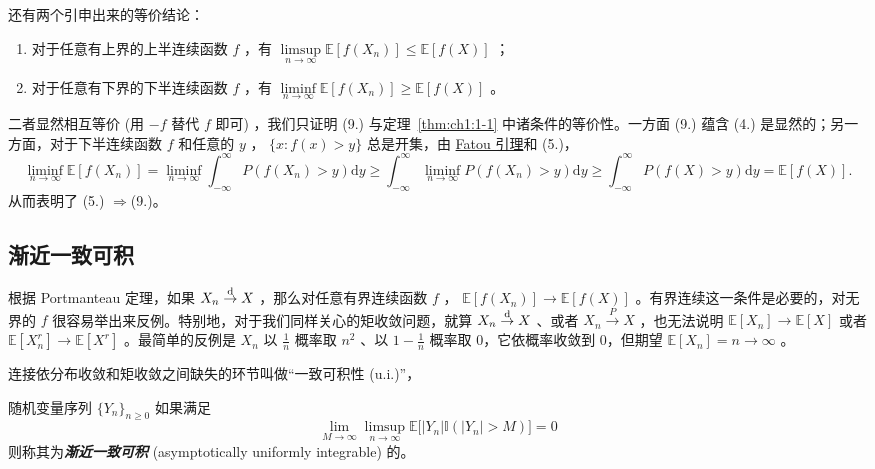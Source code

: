 \begin{remark}


  还有两个引申出来的等价结论：
  \begin{enumerate}
\tightlist
\item[8.] 对于任意有上界的上半连续函数 $f$ ，有 $\limsup\limits_{n\to\infty}\mathbb{E}[f(X_n)]\le\mathbb{E}[f(X)]$ ；
    \item[9.] 对于任意有下界的下半连续函数 $f$ ，有 $\liminf\limits_{n\to\infty}\mathbb{E}[f(X_n)]\ge\mathbb{E}[f(X)]$ 。

  \end{enumerate}

    二者显然相互等价 (用 $-f$ 替代 $f$ 即可) ，我们只证明 (9.) 与定理~\ref{thm:ch1:1-1} 中诸条件的等价性。一方面 (9.) 蕴含 (4.) 是显然的；另一方面，对于下半连续函数 $f$ 和任意的 $y$ ， $\{x:f(x)>y\}$ 总是开集，由 \href{https://en.wikipedia.org/wiki/Fatou\%27s_lemma}{Fatou 引理}和 (5.)，
    \[    \liminf_{n\to\infty}\mathbb{E}[f(X_n)]=\liminf_{n\to\infty}\int_{-\infty}^\infty P(f(X_n)>y)\mathrm dy\ge \int_{-\infty}^\infty \liminf_{n\to\infty} P(f(X_n)>y)\mathrm dy\ge \int_{-\infty}^\infty P(f(X)>y)\mathrm dy=\mathbb{E}[f(X)].
    \]    从而表明了 (5.) $\Rightarrow$(9.)。
\end{remark}

\subsection{渐近一致可积}

根据 Portmanteau 定理，如果 $X_n\overset{\rm d}\to X$ ，那么对任意有界连续函数 $f$ ， $\mathbb{E}[f(X_n)]\to \mathbb{E}[f(X)]$ 。有界连续这一条件是必要的，对无界的 $f$ 很容易举出来反例。特别地，对于我们同样关心的矩收敛问题，就算 $X_n\overset{\rm d}\to X$ 、或者 $X_n\overset{P}\to X$ ，也无法说明 $\mathbb{E}[X_n]\to \mathbb{E}[X]$ 或者 $\mathbb{E}[X_n^r]\to\mathbb{E}[X^r]$ 。最简单的反例是 $X_n$ 以 $\tfrac1n$ 概率取 $n^2$ 、以 $1-\tfrac1n$ 概率取 0，它依概率收敛到 0，但期望 $\mathbb{E}[X_n]=n\to\infty$ 。

连接依分布收敛和矩收敛之间缺失的环节叫做``一致可积性 (u.i.)''，

\begin{definition*}[渐近一致可积]

随机变量序列 $\{Y_n\}_{n\ge0}$ 如果满足
\[\lim_{M\to\infty}\limsup_{n\to\infty}\mathbb{E}\bigl[|Y_n|\mathbb{I}(|Y_n|>M)\bigr]=0\]
则称其为\textbf{\emph{渐近一致可积}} (asymptotically uniformly integrable) 的。

\end{definition*}

